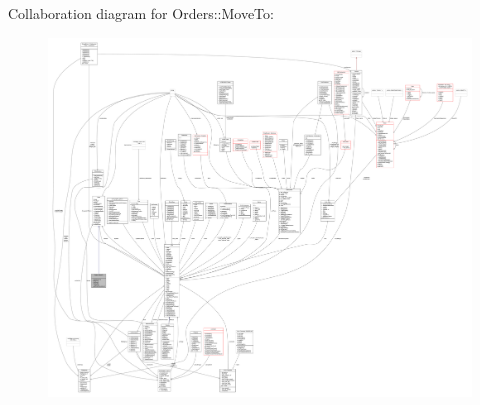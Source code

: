 Collaboration diagram for Orders\+:\+:Move\+To\+:
\nopagebreak
\begin{figure}[H]
\begin{center}
\leavevmode
\includegraphics[width=350pt]{d4/dd0/classOrders_1_1MoveTo__coll__graph}
\end{center}
\end{figure}
